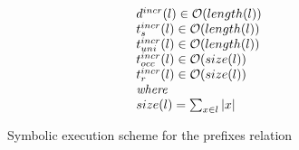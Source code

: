 \[ \begin{array}{l}
 d^{incr}(l) \in \mathcal{O}(length(l)) \\
 t_s^{incr}(l) \in \mathcal{O}(length(l)) \\
 t_{uni}^{incr}(l) \in \mathcal{O}(length(l)) \\
 t_{occ}^{incr}(l) \in \mathcal{O}(size(l)) \\
 t_{r}^{incr}(l) \in \mathcal{O}(size(l)) \\
 \textit{where} \\
 size(l) = \sum_{x \in l} |x| \\
\end{array} \]

\begin{figure}[t]
\begin{center}
\end{center}

\caption{Symbolic execution scheme for the prefixes relation}
\label{fig:prefixo_scheme}
\end{figure}


